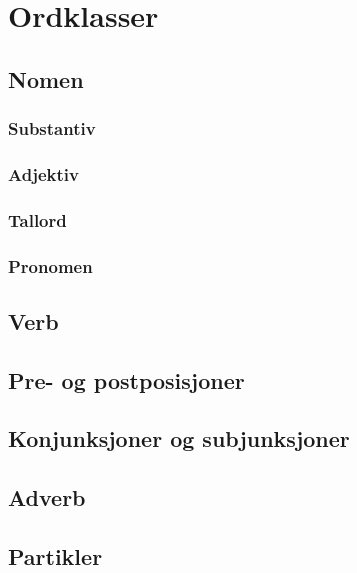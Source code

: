 \chapter{Ordklasser}

\section{Nomen}

\subsection{Substantiv}

\subsection{Adjektiv}

\subsection{Tallord}

\subsection{Pronomen}

\section{Verb}

\section{Pre- og postposisjoner}

\section{Konjunksjoner og subjunksjoner}

\section{Adverb}

\section{Partikler}